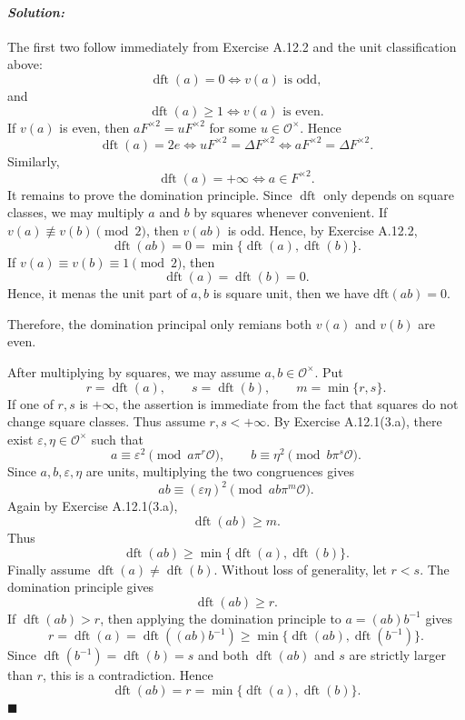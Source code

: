\documentclass[12pt, a4paper]{article}
\newenvironment{solution}
  {\paragraph{\textit{Solution:}}\par\medskip}
  {\hfill$\blacksquare$\vspace{0.1cm}}
\begin{document}
\begin{solution}
    The first two follow immediately from Exercise A.12.2 and the unit classification above: \[ \operatorname{dft}(a)=0 \Longleftrightarrow v(a)\text{ is odd}, \] and \[ \operatorname{dft}(a)\geq 1 \Longleftrightarrow v(a)\text{ is even}. \] If $v(a)$ is even, then $aF^{\times 2}=uF^{\times 2}$ for some $u\in\mathcal O^\times$. Hence \[ \operatorname{dft}(a)=2e \Longleftrightarrow uF^{\times 2}=\Delta F^{\times 2} \Longleftrightarrow aF^{\times 2}=\Delta F^{\times 2}. \] Similarly, \[ \operatorname{dft}(a)=+\infty \Longleftrightarrow a\in F^{\times 2}. \] 
    It remains to prove the domination principle. Since $\operatorname{dft}$ only depends on square classes, we may multiply $a$ and $b$ by squares whenever convenient. 
    If $v(a)\not\equiv v(b)\pmod 2$, then $v(ab)$ is odd. Hence, by Exercise A.12.2, \[ \operatorname{dft}(ab)=0 = \min\{\operatorname{dft}(a),\operatorname{dft}(b)\}. \] 
    If $v(a)\equiv v(b)\equiv 1\pmod 2$, then \[ \operatorname{dft}(a)=\operatorname{dft}(b)=0. \]
    Hence, it menas the unit part of $a,b$ is square unit, then we have $\text{dft}(ab)=0$.

    Therefore, the domination principal only remians both $v(a)$ and $v(b)$ are even.



    After multiplying by squares, we may assume $a,b\in\mathcal O^\times$. Put \[ r=\operatorname{dft}(a), \qquad s=\operatorname{dft}(b), \qquad m=\min\{r,s\}. \] If one of $r,s$ is $+\infty$, the assertion is immediate from the fact that squares do not change square classes. Thus assume $r,s<+\infty$. By Exercise A.12.1(3.a), there exist $\varepsilon,\eta\in\mathcal O^\times$ such that \[ a\equiv \varepsilon^2 \pmod{a\pi^r\mathcal O}, \qquad b\equiv \eta^2 \pmod{b\pi^s\mathcal O}. \] Since $a,b,\varepsilon,\eta$ are units, multiplying the two congruences gives \[ ab\equiv (\varepsilon\eta)^2 \pmod{ab\pi^m\mathcal O}. \] Again by Exercise A.12.1(3.a), \[ \operatorname{dft}(ab)\geq m. \] Thus \[ \operatorname{dft}(ab) \geq \min\{\operatorname{dft}(a),\operatorname{dft}(b)\}. \] Finally assume $\operatorname{dft}(a)\neq\operatorname{dft}(b)$. Without loss of generality, let $r<s$. The domination principle gives \[ \operatorname{dft}(ab)\geq r. \] If $\operatorname{dft}(ab)>r$, then applying the domination principle to $a=(ab)b^{-1}$ gives \[ r=\operatorname{dft}(a) = \operatorname{dft}((ab)b^{-1}) \geq \min\{\operatorname{dft}(ab),\operatorname{dft}(b^{-1})\}. \] Since $\operatorname{dft}(b^{-1})=\operatorname{dft}(b)=s$ and both $\operatorname{dft}(ab)$ and $s$ are strictly larger than $r$, this is a contradiction. Hence \[ \operatorname{dft}(ab)=r = \min\{\operatorname{dft}(a),\operatorname{dft}(b)\}. \]
\end{solution}
\end{document}
